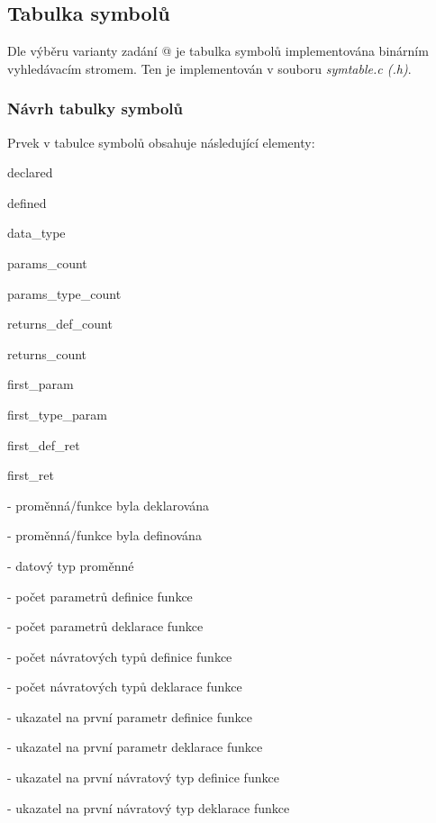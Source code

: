 \documentclass[a4paper, 12pt]{article}
\makeatletter
\newcommand*{\rom}[1]{\expandafter\@slowromancap\romannumeral #1@}
\makeatother
\begin{document}
\newpage
{}
\subsection{Tabulka symbolů}
Dle výběru varianty zadání \rom{1} je tabulka symbolů implementována binárním vyhledávacím stromem. Ten je implementován v souboru \textit{symtable.c (.h)}.

\subsubsection{Návrh tabulky symbolů}
Prvek v tabulce symbolů obsahuje následující elementy:

\vspace{1cm}

\begin{itemize}
    \begin{minipage}{0.3\linewidth}   
    \item declared
    \item defined
    \item data\_type
    \item params\_count
    \item params\_type\_count
    \item returns\_def\_count
    \item returns\_count    
    \item first\_param
    \item first\_type\_param
    \item first\_def\_ret
    \item first\_ret
    \end{minipage}
    \begin{minipage}{0.65\linewidth}   
    \item[-] proměnná/funkce byla deklarována
    \item[-] proměnná/funkce byla definována
    \item[-] datový typ proměnné
    \item[-] počet parametrů definice funkce
    \item[-] počet parametrů deklarace funkce
    \item[-] počet návratových typů definice funkce
    \item[-] počet návratových typů deklarace funkce    
    \item[-] ukazatel na první parametr definice funkce
    \item[-] ukazatel na první parametr deklarace funkce
    \item[-] ukazatel na první návratový typ definice funkce
    \item[-] ukazatel na první návratový typ deklarace funkce
    \end{minipage}
\end{itemize}
\end{document}
